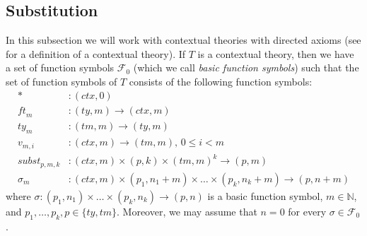 \documentclass[reqno]{amsart}
\theoremstyle{definition}
\theoremstyle{remark}
\newcommand{\subst}{\mathit{subst}}
\newcommand{\ft}{\mathit{ft}}
\newcommand{\ty}{\mathit{ty}}
\newcommand{\ctx}{\mathit{ctx}}
\newcommand{\tm}{\mathit{tm}}
\numberwithin{figure}{section}
\begin{document}
\subsection{Substitution}

In this subsection we will work with contextual theories with directed axioms (see \cite{alg-tt} for a definition of a contextual theory).
If $T$ is a contextual theory, then we have a set of function symbols $\mathcal{F}_0$ (which we call \emph{basic function symbols}) such that the set of function symbols of $T$ consists of the following function symbols:
\begin{align*}
* & : (\ctx,0) \\
\ft_m & : (\ty,m) \to (\ctx,m) \\
\ty_m & : (\tm,m) \to (\ty,m) \\
v_{m,i} & : (\ctx,m) \to (\tm,m) \text{, } 0 \leq i < m \\
\subst_{p,m,k} & : (\ctx,m) \times (p,k) \times (\tm,m)^k \to (p,m) \\
\sigma_m & : (\ctx,m) \times (p_1,n_1+m) \times \ldots \times (p_k,n_k+m) \to (p,n+m)
\end{align*}
where $\sigma : (p_1,n_1) \times \ldots \times (p_k,n_k) \to (p,n)$ is a basic function symbol, $m \in \mathbb{N}$, and $p_1, \ldots, p_k, p \in \{ \ty, \tm \}$.
Moreover, we may assume that $n = 0$ for every $\sigma \in \mathcal{F}_0$.
\end{document}
